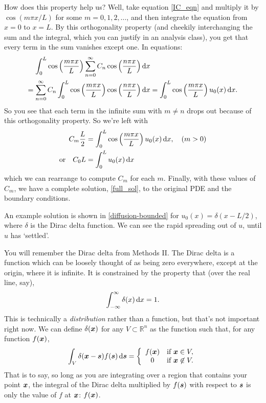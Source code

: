 \documentclass[main.tex]{subfiles}
\begin{document}
How does this property help us? Well, take equation \cref{IC_eqn} and multiply it by $\cos(m \pi x/L)$ for some $m=0,1,2,\dots$, and then integrate the equation from $x=0$ to $x=L$. By this orthogonality property (and cheekily interchanging the sum and the integral, which you can justify in an analysis class), you get that every term in the sum vanishes except one. In equations:
\begin{align}
    \int_0^L\cos\left(\frac{m \pi x}{L}\right)\sum_{n=0}^\infty C_n \cos\left(\frac{ n \pi x}{L}\right)\mathrm{d} x & \\
     = \sum_{n=0}^\infty C_n \int_0^L\cos\left(\frac{m \pi x}{L}\right)\cos\left(\frac{n \pi x}{L}\right) \mathrm{d} x 
    & = \int_0^L\cos\left(\frac{m \pi x}{L}\right)u_0(x) \, \mathrm{d} x.
\end{align}
So you see that each term in the infinite sum with $m\neq n$ drops out because of this orthogonality property. So we're left with
\begin{align}
    C_m \frac{L}{2} & = \int_0^L\cos\left(\frac{m \pi x}{L}\right)u_0(x) \, \mathrm{d} x, \quad (m>0) \\
	\text{or} \quad C_0 L &= \int_0^L u_0(x) \, \mathrm{d} x 
\end{align}
which we can rearrange to compute $C_m$ for each $m$. Finally, with these values of $C_m$, we have a complete solution, \cref{full_sol}, to the original PDE and the boundary conditions.

An example solution is shown in \cref{diffusion-bounded} for $u_0(x) = \delta(x-L/2)$, where $\delta$ is the Dirac delta function. We can see the rapid spreading out of $u$, until $u$ has `settled'.

\begin{info}
	You will remember the Dirac delta from Methods II. The Dirac delta is a function which can be loosely thought of as being zero everywhere, except at the origin, where it is infinite. It is constrained by the property that (over the real line, say),
\begin{equation}
	\int_{-\infty}^\infty \delta(x) \, \mathrm{d} x = 1.
\end{equation}
This is technically a \emph{distribution} rather than a function, but that's not important right now. We can define $\delta(\v{x})$ for any $V\subset \mathbb{R}^n$ as the function such that, for any function $f(\v{x})$,
\begin{equation}
\label{deltafunc}
\int_{V}\delta(\v{x} - \v{s})f(\v{s})\,\d{\v{s}} = \left\{
\begin{array}{cl}
f(\v{x}) & \mbox{if } \v{x} \in V,\\
0  &  \mbox{if } \v{x} \not\in V.
\end{array}
\right.
\end{equation}
That is to say, so long as you are integrating over a region that contains your point $\v{x}$, the integral of the Dirac delta multiplied by $f(\v{s})$ with respect to $\v{s}$ is only the value of $f$ at $\v{x}$: $f(\v{x})$.
\end{info}
\end{document}
